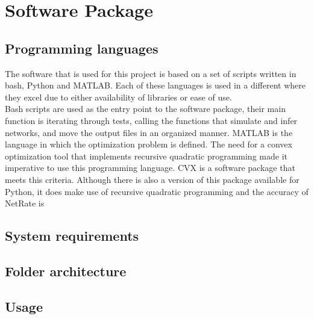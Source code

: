 
\chapter{Software Package}

\section{Programming languages}

The software that is used for this project is based on a set of scripts written in bash, Python and MATLAB. Each of these languages is used in a different where they excel due to either availability of libraries or ease of use. \\

Bash scripts are used as the entry point to the software package, their main function is iterating through tests, calling the functions that simulate and infer networks, and move the output files in an organized manner.
MATLAB is the language in which the optimization problem is defined. The need for a convex optimization tool that implements recursive quadratic programming made it imperative to use this programming language. CVX is a software package that meets this criteria. Although there is also a version of this package available for Python, it does make use of recursive quadratic programming and the accuracy of NetRate is 
 

\section{System requirements}
\section{Folder architecture}
\section{Usage}
